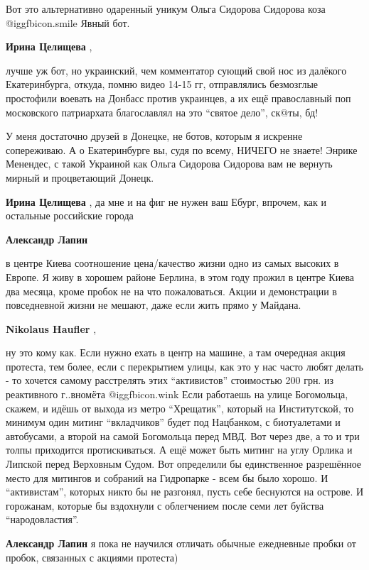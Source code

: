 \begin{itemize}
\begin{itemize}
Вот это альтернативно одаренный уникум Ольга Сидорова Сидорова коза  @igg{fbicon.smile}  Явный бот.

\textbf{Ирина Целищева} , 

лучше уж бот, но украинский, чем комментатор сующий свой нос из далёкого
Екатеринбурга, откуда, помню видео 14-15 гг, отправлялись безмозглые простофили
воевать на Донбасс против украинцев, а их ещё православный поп московского
патриархата благославлял на это \enquote{святое дело}, ск@ты, бд!


У меня достаточно друзей в Донецке, не ботов, которым я искренне сопереживаю. А
о Екатеринбурге вы, судя по всему, НИЧЕГО не знаете! Энрике Менендес, с такой
Украиной как Ольга Сидорова Сидорова вам не вернуть мирный и процветающий
Донецк.

\textbf{Ирина Целищева} , да мне и на фиг не нужен ваш Ебург, впрочем, как и остальные российские города

\textbf{Александр Лапин} 

в центре Киева соотношение цена/качество жизни одно из самых высоких в Европе.
Я живу в хорошем районе Берлина, в этом году прожил в центре Киева два месяца,
кроме пробок не на что пожаловаться. Акции и демонстрации в повседневной жизни
не мешают, даже если жить прямо у Майдана.


\textbf{Nikolaus Haufler} , 

ну это кому как. Если нужно ехать в центр на машине, а там очередная акция
протеста, тем более, если с перекрытием улицы, как это у нас часто любят делать
- то хочется самому расстрелять этих \enquote{активистов} стоимостью 200 грн. из
реактивного г..вномёта  @igg{fbicon.wink} Если работаешь на улице Богомольца, скажем, и идёшь от
выхода из метро \enquote{Хрещатик}, который на Институтской, то минимум один митинг
\enquote{вкладчиков} будет под Нацбанком, с биотуалетами и автобусами, а второй на
самой Богомольца перед МВД. Вот через две, а то и три толпы приходится
протискиваться. А ещё может быть митинг на углу Орлика и Липской перед
Верховным Судом. Вот определили бы единственное разрешённое место для митингов
и собраний на Гидропарке - всем бы было хорошо. И \enquote{активистам}, которых никто
бы не разгонял, пусть себе беснуются на острове. И горожанам, которые бы
вздохнули с облегчением после семи лет буйства \enquote{народовластия}.

\textbf{Александр Лапин} я пока не научился отличать обычные ежедневные пробки от пробок, связанных с акциями протеста)


\end{itemize}
\end{itemize}
